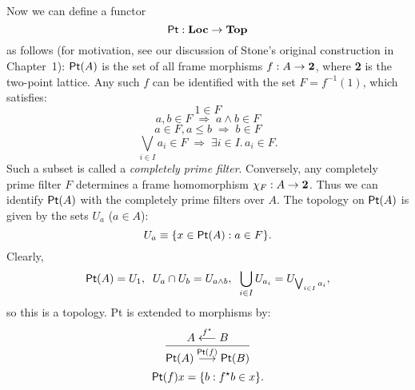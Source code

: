 Now we can define a functor
\[ {\sf Pt} : {\bf Loc} \rightarrow {\bf Top} \]
as follows (for motivation, see our discussion of Stone's original construction in Chapter~1):
${\sf Pt} (A)$ is the set of all frame morphisms $f : A \rightarrow {\bf 2}$, where {\bf 2} is the two-point lattice.
Any such $f$ can be identified with the set $F = f^{-1}(1)$, which satisfies:
\[ 1 \in F \]
\[ a, b \in F \; \Rightarrow \; a \wedge b \in F \]
\[ a \in F, a \leq b \; \Rightarrow \; b \in F \]
\[ \bigvee_{i \in I} a_{i} \in F \; \Rightarrow \; \exists i \in I. \, a_{i} \in F . \]
Such a subset is called a {\em completely prime filter}.
Conversely, any completely prime filter $F$ determines a frame homomorphism 
$\chi_{F} : A \rightarrow {\bf 2}$.
Thus we can identify ${\sf Pt}(A)$ with the completely prime filters over $A$.
The topology on ${\sf Pt}(A)$ is given by the sets $U_{a}$ ($a \in A$):
\[ U_{a} \equiv \{ x \in {\sf Pt}(A) : a \in F \} . \]
Clearly, 
\[ {\sf Pt}(A) = U_{1}, \;\; U_{a} \cap U_{b} = U_{a \wedge b}, \;\; \bigcup_{i \in I} U_{a_{i}} = U_{\bigvee_{i \in I} a_{i}}, \]
so this is a topology.
{\sf Pt} is extended to morphisms by:
\[ \frac{A \stackrel{f^{\star}}{\longleftarrow} B}{{\sf Pt}(A) \stackrel{{\sf Pt}(f)}{\longrightarrow} {\sf Pt}(B)} \]
\[ {\sf Pt}(f) x = \{ b : f^{\star} b \in x \} . \]

